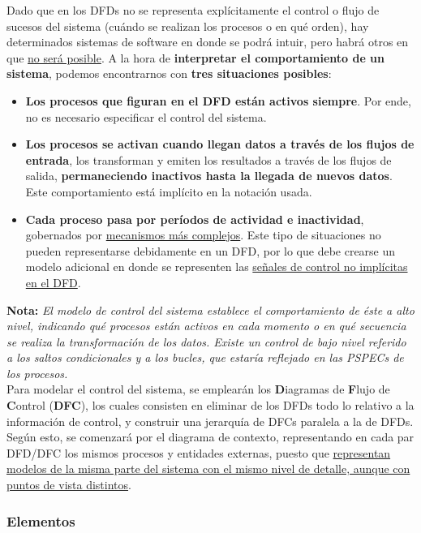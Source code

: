 Dado que en los DFDs no se representa explícitamente el control o flujo de sucesos del sistema (cuándo se realizan los procesos o en qué orden), hay determinados sistemas de software en donde se podrá intuir, pero habrá otros en que \uline{no será posible}. A la hora de \textbf{interpretar el comportamiento de un sistema}, podemos encontrarnos con \textbf{tres situaciones posibles}:

\begin{itemize}
    \item \textbf{Los procesos que figuran en el DFD están activos siempre}. Por ende, no es necesario especificar el control del sistema.
    \item \textbf{Los procesos se activan cuando llegan datos a través de los flujos de entrada}, los transforman y emiten los resultados a través de los flujos de salida, \textbf{permaneciendo inactivos hasta la llegada de nuevos datos}. Este comportamiento está implícito en la notación usada.
    \item \textbf{Cada proceso pasa por períodos de actividad e inactividad}, gobernados por \uline{mecanismos más complejos}. Este tipo de situaciones no pueden representarse debidamente en un DFD, por lo que debe crearse un modelo adicional en donde se representen las \uline{señales de control no implícitas en el DFD}.
\end{itemize}

\textbf{Nota:} \textit{El modelo de control del sistema establece el comportamiento de éste a alto nivel, indicando qué procesos están activos en cada momento o en qué secuencia se realiza la transformación de los datos. Existe un control de bajo nivel referido a los saltos condicionales y a los bucles, que estaría reflejado en las PSPECs de los procesos.}\\

Para modelar el control del sistema, se emplearán los \textbf{D}iagramas de \textbf{F}lujo de \textbf{C}ontrol (\textbf{DFC}), los cuales consisten en eliminar de los DFDs todo lo relativo a la información de control, y construir una jerarquía de DFCs paralela a la de DFDs. Según esto, se comenzará por el diagrama de contexto, representando en cada par DFD/DFC los mismos procesos y entidades externas, puesto que \uline{representan modelos de la misma parte del sistema con el mismo nivel de detalle, aunque con puntos de vista distintos}.\\

\subsubsection{Elementos}

